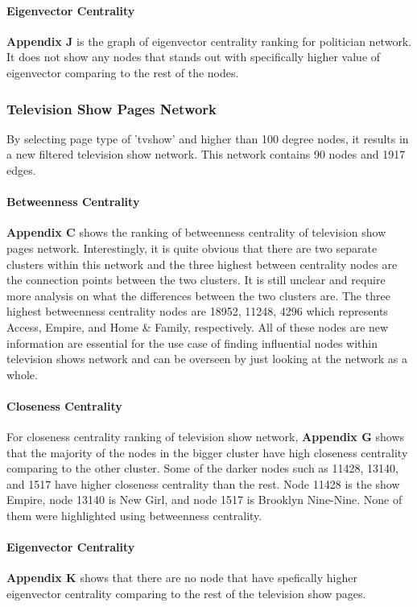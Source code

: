 \documentclass[11pt,twocolumn]{article}
\begin{document}
\paragraph{Eigenvector Centrality}
\textbf{Appendix J} is the graph of eigenvector centrality ranking for politician network. It does not show any nodes that stands out with specifically higher value of eigenvector comparing to the rest of the nodes.

\subsubsection{Television Show Pages Network}
By selecting page type of 'tvshow' and higher than 100 degree nodes, it results in a new filtered television show network. This network contains 90 nodes and 1917 edges.

\paragraph{Betweenness Centrality}
\textbf{Appendix C} shows the ranking of betweenness centrality of television show pages network. Interestingly, it is quite obvious that there are two separate clusters within this network and the three highest between centrality nodes are the connection points between the two clusters. It is still unclear and require more analysis on what the differences between the two clusters are. The three highest betweenness centrality nodes are 18952, 11248, 4296 which represents Access, Empire, and Home \& Family, respectively. All of these nodes are new information are essential for the use case of finding influential nodes within television shows network and can be overseen by just looking at the network as a whole. 

\paragraph{Closeness Centrality}
For closeness centrality ranking of television show network, \textbf{Appendix G} shows that the majority of the nodes in the bigger cluster have high closeness centrality comparing to the other cluster. Some of the darker nodes such as 11428, 13140, and 1517 have higher closeness centrality than the rest. Node 11428 is the show Empire, node 13140 is New Girl, and node 1517 is Brooklyn Nine-Nine. None of them were highlighted using betweenness centrality. 

\paragraph{Eigenvector Centrality}
\textbf{Appendix K} shows that there are no node that have spefically higher eigenvector centrality comparing to the rest of the television show pages.
\end{document}
